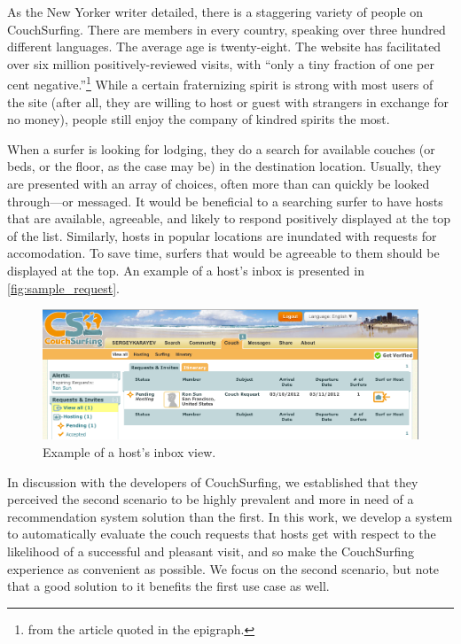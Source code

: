 As the New Yorker writer detailed, there is a staggering variety of people on CouchSurfing.
There are members in every country, speaking over three hundred different languages.
The average age is twenty-eight.
The website has facilitated over six million positively-reviewed visits, with ``only a tiny fraction of one per cent negative.''\footnote{from the article quoted in the epigraph.}
While a certain fraternizing spirit is strong with most users of the site (after all, they are willing to host or guest with strangers in exchange for no money), people still enjoy the company of kindred spirits the most.

When a surfer is looking for lodging, they do a search for available couches (or beds, or the floor, as the case may be) in the destination location.
Usually, they are presented with an array of choices, often more than can quickly be looked through---or messaged.
It would be beneficial to a searching surfer to have hosts that are available, agreeable, and likely to respond positively displayed at the top of the list.
Similarly, hosts in popular locations are inundated with requests for accomodation.
To save time, surfers that would be agreeable to them should be displayed at the top.
An example of a host's inbox is presented in \autoref{fig:sample_request}.

\begin{figure}[ht]
\centering
\includegraphics[width=1\linewidth]{figures/screenshots/requests.png}
\caption{Example of a host's inbox view.}
\label{fig:sample_request}
\end{figure}

In discussion with the developers of CouchSurfing, we established that they perceived the second scenario to be highly prevalent and more in need of a recommendation system solution than the first.
In this work, we develop a system to automatically evaluate the couch requests that hosts get with respect to the likelihood of a successful and pleasant visit, and so make the CouchSurfing experience as convenient as possible.
We focus on the second scenario, but note that a good solution to it benefits the first use case as well.